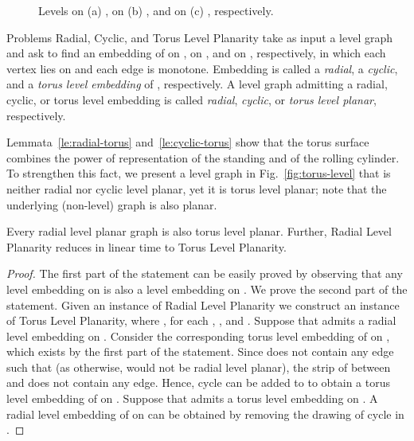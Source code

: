 \documentclass{llncs}
\begin{document}
 \begin{figure}[tb!]
\centering
{}\hfil
{}\hfil
{}
\caption{Levels on (a) , on (b) , and on (c) , respectively.
} 
\label{fig:levels}
\end{figure}

Problems {\sc Radial}, {\sc Cyclic}, and {\sc Torus Level Planarity} take as input a level graph  and ask to find an embedding  of  on , on , and on , respectively, in which each vertex  lies on  and each edge  is monotone. Embedding  is called a {\em radial}, a {\em cyclic}, and a {\em torus level embedding} of , respectively.
A level graph admitting a radial, cyclic, or torus level embedding is called {\em radial}, {\em cyclic}, or {\em torus level planar}, respectively.

Lemmata~\ref{le:radial-torus} and~\ref{le:cyclic-torus} show that the torus surface combines the power of representation of the standing and of the rolling cylinder. To strengthen this fact, we present a level graph in Fig.~\ref{fig:torus-level} that is neither radial nor cyclic level planar, yet it is torus level planar; note that the underlying (non-level) graph is also planar.

\begin{lemma}\label{le:radial-torus}
Every radial level planar graph is also torus level planar.
Further, {\sc Radial Level Planarity} reduces in linear time to {\sc Torus Level Planarity}.
\end{lemma}

\begin{proof}
The first part of the statement can be easily proved by observing that any level embedding on  is also a level embedding on .
We prove the second part of the statement. 
		Given an instance  of {\sc Radial Level Planarity} we construct an instance  of {\sc Torus Level Planarity}, where , for each , , and . 
Suppose that  admits a radial level embedding  on . Consider the corresponding torus level embedding  of  on , which exists by the first part of the statement. Since  does not contain any edge  such that  (as otherwise,  would not be radial level planar), the strip of  between  and  does not contain any edge. Hence, cycle  can be added to  to obtain a torus level embedding of  on .
		Suppose that  admits a torus level embedding  on .
		A radial level embedding of  on  can be obtained by removing the drawing of cycle  in .
		\end{proof}
\end{document}
